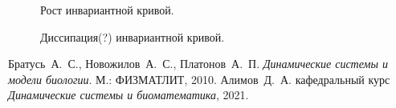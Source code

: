 \documentclass[oneside,final,12pt]{article}
\newcommand*\subpicsize{0.45\textwidth}
\newcommand*\picpath{pictures/}
\theoremstyle{plain}
\theoremstyle{remark}
\theoremstyle{definition}
\theoremstyle{plain}
\begin{document}
		\begin{figure}[!h]
			\centering
			\qquad
			\caption{Рост инвариантной кривой.}
		\end{figure}

		\begin{figure}[!h]
			\centering
			\qquad
			\caption{Диссипация(?) инвариантной кривой.}
		\end{figure}

\newpage
	\begin{thebibliography}{0}
		 Братусь~А.~С., Новожилов~А.~С., Платонов~А.~П.
			\emph{Динамические системы и модели биологии}. М.: ФИЗМАТЛИТ, 2010.
		 Алимов~Д.~А. кафедральный курс 
			\emph{Динамические системы и биоматематика}, 2021.
	\end{thebibliography}
\end{document}
